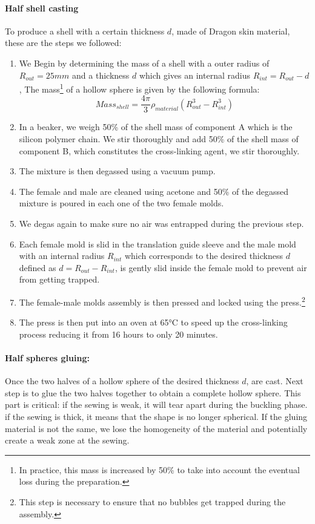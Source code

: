 \paragraph{Half shell casting}
To produce a shell with a certain thickness $d$, made of Dragon skin material, these are the steps we followed: 
\begin{enumerate}
	\item We Begin by determining the mass of a shell with a outer radius of $R_{out}= 25 mm$ and a thickness $d$ which gives an internal radius $R_{int} = R_{out}-d$, The mass\footnote{In practice, this mass is increased by 50\% to take into account the eventual loss during the preparation.} of a hollow sphere is given by the following formula:
		\[Mass_{shell} = \frac{4\pi}{3}\rho_{material} (R_{out}^3-R_{int}^3) \]

	\item In a beaker, we weigh 50\% of the shell mass of component A which is the silicon polymer chain. We stir thoroughly and add 50\% of the shell mass of component B, which constitutes the cross-linking agent, we stir thoroughly.
	\item The mixture is then degassed using a vacuum pump.
	\item The female and male are cleaned using acetone and 50\% of the degassed mixture is poured in each one of the two female molds.
	\item We degas again to make sure no air was entrapped during the previous step.
	\item Each female mold is slid in the translation guide sleeve and the male mold with an internal radius $ R_{int}$ which corresponds to the desired thickness $d$ defined as $d = R_{out}-R_{int}$, is gently slid inside the female mold to prevent air from getting trapped.
	\item The female-male molds assembly is then pressed and locked using the press.\footnote{This step is necessary to ensure that no bubbles get trapped during the assembly.}
	\item The press is then put into an oven at 65°C to speed up the cross-linking process reducing it from 16 hours to only 20 minutes.
	
\end{enumerate}

\paragraph{Half spheres gluing:}
Once the two halves of a hollow sphere of the desired thickness $d$, are cast. Next step is to glue the two halves together to obtain a complete hollow sphere.
This part is critical: if the sewing is weak, it will tear apart during the buckling phase. if the sewing is thick, it means that the shape is no longer spherical. If the gluing material is not the same, we lose the homogeneity of the material and potentially create a weak zone at the sewing.
